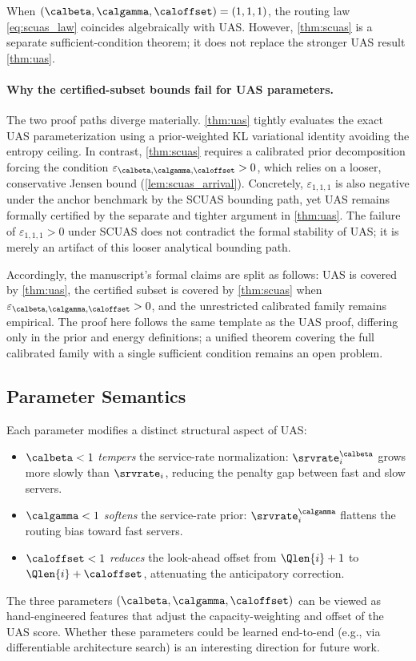 \begin{remark}
\label{rem:scuas_scope}
When $(\calbeta,\calgamma,\caloffset)=(1,1,1)$, the routing law \eqref{eq:scuas_law} coincides algebraically with UAS.
However, \cref{thm:scuas} is a separate sufficient-condition theorem; it does not replace the stronger UAS result \cref{thm:uas}. 

\paragraph{Why the certified-subset bounds fail for UAS parameters.}
The two proof paths diverge materially. \cref{thm:uas} tightly evaluates the exact UAS parameterization using a prior-weighted KL variational identity avoiding the entropy ceiling. In contrast, \cref{thm:scuas} requires a calibrated prior decomposition forcing the condition $\varepsilon_{\calbeta,\calgamma,\caloffset}>0$, which relies on a looser, conservative Jensen bound (\cref{lem:scuas_arrival}). Concretely, $\varepsilon_{1,1,1}$ is also negative under the anchor benchmark by the SCUAS bounding path, yet UAS remains formally certified by the separate and tighter argument in \cref{thm:uas}. The failure of $\varepsilon_{1,1,1} > 0$ under SCUAS does not contradict the formal stability of UAS; it is merely an artifact of this looser analytical bounding path.

Accordingly, the manuscript's formal claims are split as follows:
UAS is covered by \cref{thm:uas}, the certified subset is covered by \cref{thm:scuas} when $\varepsilon_{\calbeta,\calgamma,\caloffset}>0$, and the unrestricted calibrated family remains empirical. The proof here follows the same template as the UAS proof, differing only in the prior and energy definitions; a unified theorem covering the full calibrated family with a single sufficient condition remains an open problem.
\end{remark}

\subsection{Parameter Semantics}
Each parameter modifies a distinct structural aspect of UAS:
\begin{itemize}
\item $\calbeta < 1$ \emph{tempers} the service-rate normalization: $\srvrate_i^{\calbeta}$ grows more slowly than $\srvrate_i$, reducing the penalty gap between fast and slow servers.
\item $\calgamma < 1$ \emph{softens} the service-rate prior: $\srvrate_i^{\calgamma}$ flattens the routing bias toward fast servers.
\item $\caloffset < 1$ \emph{reduces} the look-ahead offset from $\Qlen{i}+1$ to $\Qlen{i}+\caloffset$, attenuating the anticipatory correction.
\end{itemize}
The three parameters $(\calbeta,\calgamma,\caloffset)$ can be viewed as hand-engineered features that adjust the capacity-weighting and offset of the UAS score. Whether these parameters could be learned end-to-end (e.g., via differentiable architecture search) is an interesting direction for future work.

